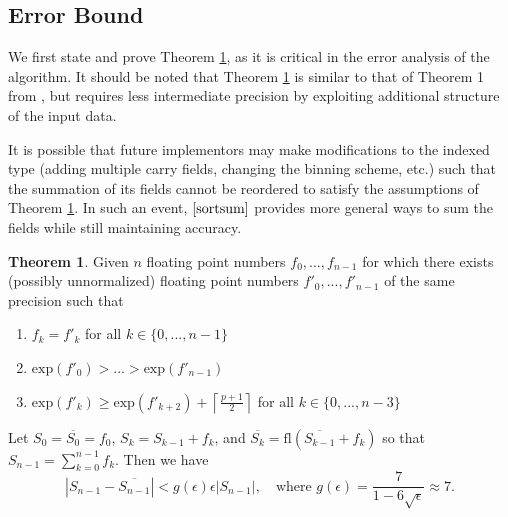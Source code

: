 \documentclass[12pt]{article}
\providecommand{\ceil}[1]{\left \lceil #1 \right \rceil }
\providecommand{\exp}{\ensuremath{\text{exp}}}
\providecommand{\fl}{\ensuremath{\text{fl}}}
\theoremstyle{definition}
\newtheorem{thm}{Theorem}[section]
\numberwithin{equation}{section}
\numberwithin{figure}{section}
\begin{document}
  \subsection{Error Bound}
    \label{sec:primitiveops_error}

    We first state and prove Theorem \ref{thm:mysortsum}, as it is critical in the error analysis of the algorithm. It should be noted that Theorem \ref{thm:mysortsum} is similar to that of Theorem 1 from \cite{sortsum}, but requires less intermediate precision by exploiting additional structure of the input data.

    It is possible that future implementors may make modifications to the indexed type (adding multiple carry fields, changing the binning scheme, etc.) such that the summation of its fields cannot be reordered to satisfy the assumptions of Theorem \ref{thm:mysortsum}. In such an event, $\cite{sortsum}$ provides more general ways to sum the fields while still maintaining accuracy.
      \begin{samepage}
    \begin{thm}
      Given $n$ floating point numbers $f_0, ..., f_{n - 1}$ for which there exists (possibly unnormalized) floating point numbers $f'_0, ..., f'_{n - 1}$ of the same precision such that
      \begin{enumerate}
        \item $f_k = f'_k$ for all $k \in \{0, ..., n - 1\}$
        \item $\exp(f'_0) > ... > \exp(f'_{n - 1})$
        \item $\exp(f'_k) \geq \exp(f'_{k + 2}) + \ceil{\frac{p + 1}{2}}$ for all $k \in \{0, ..., n - 3\}$
      \end{enumerate}
      \label{thm:mysortsum}
      Let $S_0 = \overline{S_0} = f_0$, $S_k = S_{k - 1} + f_k$, and $\overline{S_k} = \fl(\overline{S_{k - 1}} + f_k)$ so that $S_{n - 1} = \sum \limits_{k = 0}^{n - 1} f_k$.
      Then we have
      \begin{equation}
        |S_{n - 1} - \overline{S_{n - 1}}| < g(\epsilon) \epsilon |S_{n-1}|, 
        \quad \text{where } g(\epsilon) = \frac{7}{1 - 6\sqrt\epsilon} \approx 7.
        \label{eq:g}
      \end{equation}
    \end{thm}
    \end{samepage}
\end{document}
